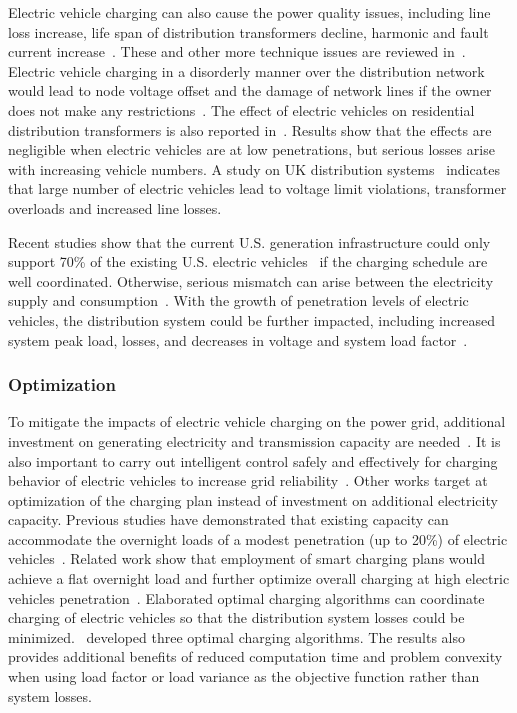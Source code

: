 Electric vehicle charging can also cause the power quality issues, including line loss increase, life span of distribution transformers decline, harmonic and fault current increase~\cite{YC_Papadopoulos27,YC_Richardson28,YC_Gomez29,YC_Chan30,YC_Leite33}. 
These and other more technique issues are reviewed in~\cite{YC_Green}. 
Electric vehicle charging in a disorderly manner over the distribution network would lead to node voltage offset and the damage of network lines if the owner does not make any restrictions~\cite{YC_Jian}.
The effect of electric vehicles on residential distribution transformers is also reported in~\cite{YC_Gong}.
Results show that the effects are negligible when electric vehicles are at low penetrations, but serious losses arise with increasing vehicle numbers.
A study on UK distribution systems~\cite{YC_Papadopoulos} indicates that large number of electric vehicles lead to voltage limit violations, transformer overloads and increased line losses. 

Recent studies show that the current U.S. generation infrastructure  could only support 70\% of the existing U.S. electric vehicles~\cite{YC_Schneider} if the charging schedule are well coordinated. 
Otherwise, serious mismatch can arise between the electricity supply and consumption~\cite{YC_Hadley18}.
With the growth of penetration levels of electric vehicles, the distribution system could be further impacted, including increased system peak load, losses, and decreases in voltage and system load factor~\cite{YC_Roe,YC_Clement09}.

\subsubsection{Optimization}

To mitigate the impacts of electric vehicle charging on the power grid, additional investment on generating electricity and transmission capacity are needed~\cite{YC_Hadley}.
It is also important to carry out intelligent control safely and effectively for charging behavior of electric vehicles to increase grid reliability~\cite{YC_Papadopoulos}.
Other works target at optimization of the charging plan instead of investment on additional electricity capacity. Previous studies have demonstrated that existing capacity can accommodate the overnight loads of a modest penetration (up to 20\%) of electric vehicles~\cite{YC_FORD1995207}. Related work show that employment of smart charging plans would achieve a flat overnight load and further optimize overall charging at high electric vehicles penetration~\cite{YC_JUUL20113523,YC_Denholm21}.
Elaborated optimal charging algorithms can coordinate charging of electric vehicles so that the distribution system losses could be minimized.~\cite{YC_Sortomme} developed three optimal charging algorithms. The results also provides additional benefits of reduced computation time and problem convexity when using load factor or load variance as the objective function rather than system losses.

